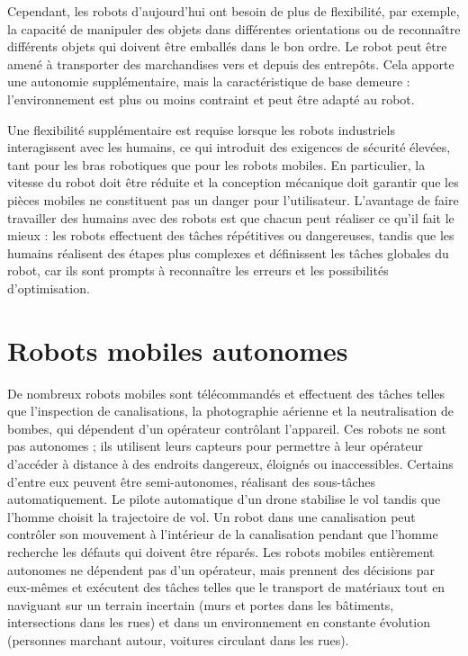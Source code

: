 {Cependant, les robots d'aujourd'hui ont besoin de plus de flexibilité, par exemple, la capacité de manipuler des objets dans différentes orientations ou de reconnaître différents objets qui doivent être emballés dans le bon ordre. Le robot peut être amené à transporter des marchandises vers et depuis des entrepôts. Cela apporte une autonomie supplémentaire, mais la caractéristique de base demeure : l'environnement est plus ou moins contraint et peut être adapté au robot.

Une flexibilité supplémentaire est requise lorsque les robots industriels interagissent avec les humains, ce qui introduit des exigences de sécurité élevées, tant pour les bras robotiques que pour les robots mobiles. En particulier, la vitesse du robot doit être réduite et la conception mécanique doit garantir que les pièces mobiles ne constituent pas un danger pour l'utilisateur. L'avantage de faire travailler des humains avec des robots est que chacun peut réaliser ce qu'il fait le mieux : les robots effectuent des tâches répétitives ou dangereuses, tandis que les humains réalisent des étapes plus complexes et définissent les tâches globales du robot, car ils sont prompts à reconnaître les erreurs et les possibilités d'optimisation.

\section{Robots mobiles autonomes}

De nombreux robots mobiles sont télécommandés et effectuent des tâches telles que l'inspection de canalisations, la photographie aérienne et la neutralisation de bombes, qui dépendent d'un opérateur contrôlant l'appareil. Ces robots ne sont pas autonomes ; ils utilisent leurs capteurs pour permettre à leur opérateur d'accéder à distance à des endroits dangereux, éloignés ou inaccessibles. Certains d'entre eux peuvent être semi-autonomes, réalisant des sous-tâches automatiquement. Le pilote automatique d'un drone stabilise le vol tandis que l'homme choisit la trajectoire de vol. Un robot dans une canalisation peut contrôler son mouvement à l'intérieur de la canalisation pendant que l'homme recherche les défauts qui doivent être réparés. Les robots mobiles entièrement autonomes ne dépendent pas d'un opérateur, mais prennent des décisions par eux-mêmes et exécutent des tâches telles que le transport de matériaux tout en naviguant sur un terrain incertain (murs et portes dans les bâtiments, intersections dans les rues) et dans un environnement en constante évolution (personnes marchant autour, voitures circulant dans les rues).

}
